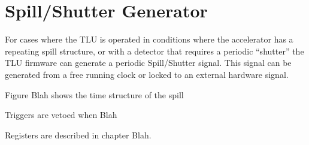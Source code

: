 \chapter{Spill/Shutter Generator}\label{ch:spill_generator}
For cases where the TLU is operated in conditions where the
accelerator has a repeating spill structure, or with a detector that
requires a periodic ``shutter'' the TLU firmware can generate a
periodic Spill/Shutter signal. This signal can be generated from a
free running clock or locked to an external hardware signal.

Figure Blah shows the time structure of the spill

Triggers are vetoed when Blah

Registers are described in chapter Blah.
